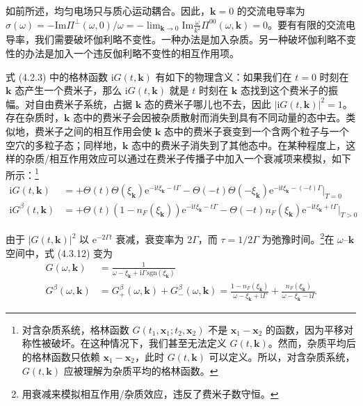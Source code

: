 如前所述，均匀电场只与质心运动耦合。因此，$\pmb{k}=0$ 的交流电导率为 $\sigma(\omega)=-\mathrm{Im}\Pi^{\perp}(\omega,0)/\omega=-\lim_{\pmb{k}\to 0}\mathrm{Im}\frac{\omega}{k^2}\Pi^{00}(\omega,\pmb{k})=0$。要有有限的交流电导率，我们需要破坏伽利略不变性。一种办法是加入杂质。另一种破坏伽利略不变性的办法是加入一个违反伽利略不变性的相互作用项。

式 (4.2.3) 中的格林函数 $\mathrm{i}G(t,\pmb{k})$ 有如下的物理含义：如果我们在 $t=0$ 时刻在 $\pmb{k}$ 态产生一个费米子，那么 $\mathrm{i}G(t,\pmb{k})$ 就是 $t$ 时刻在 $\pmb{k}$ 态找到这个费米子的振幅。对自由费米子系统，占据 $\pmb{k}$ 态的费米子哪儿也不去，因此 $|\mathrm{i}G(t,\pmb{k})|^2=1$。存在杂质时，$\pmb{k}$ 态中的费米子会因被杂质散射而消失到具有不同动量的态中去。类似地，费米子之间的相互作用会使 $\pmb{k}$ 态中的费米子衰变到一个含两个粒子与一个空穴的多粒子态；同样地，$\pmb{k}$ 态中的费米子消失到了其他态中。在某种程度上，这样的杂质/相互作用效应可以通过在费米子传播子中加入一个衰减项来模拟，如下所示：\footnote{对含杂质系统，格林函数 $G(t_1,\pmb{x}_1;t_2,\pmb{x}_2)$ 不是 $\pmb{x}_1-\pmb{x}_2$ 的函数，因为平移对称性被破坏。在这种情况下，我们甚至无法定义 $G(t,\pmb{k})$。然而，杂质平均后的格林函数只依赖 $\pmb{x}_1-\pmb{x}_2$，此时 $G(t,\pmb{k})$ 可以定义。所以，对含杂质系统，$G(t,\pmb{k})$ 应被理解为杂质平均的格林函数。}
\begin{align*}
\mathrm{i}G(t,\pmb{k}) &= +\Theta(t)\Theta(\xi_{\pmb{k}})\mathrm{e}^{-\mathrm{i}t\xi_{\pmb{k}}-t\Gamma} - \Theta(-t)\Theta(-\xi_{\pmb{k}})\mathrm{e}^{-\mathrm{i}t\xi_{\pmb{k}}-(-t)\Gamma}\Big|_{T=0}\\
\mathrm{i}G^{\beta}(t,\pmb{k}) &= +\Theta(t)\left(1-n_F(\xi_{\pmb{k}})\right)\mathrm{e}^{-\mathrm{i}t\xi_{\pmb{k}}-t\Gamma} - \Theta(-t)n_F(\xi_{\pmb{k}})\mathrm{e}^{-\mathrm{i}t\xi_{\pmb{k}}+t\Gamma}\Big|_{T>0} \tag{4.3.12}
\end{align*}

由于 $|G(t,\pmb{k})|^2$ 以 $\mathrm{e}^{-2\Gamma t}$ 衰减，衰变率为 $2\Gamma$，而 $\tau=1/2\Gamma$ 为弛豫时间。\footnote{用衰减来模拟相互作用/杂质效应，违反了费米子数守恒。}在 $\omega$–$\pmb{k}$ 空间中，式 (4.3.12) 变为
\begin{align*}
G(\omega,\pmb{k}) &= \frac{1}{\omega-\xi_{\pmb{k}}+\mathrm{i}\Gamma\,\mathrm{sgn}(\xi_{\pmb{k}})} \tag{4.3.13}\\
G^{\beta}(\omega,\pmb{k}) &= G^{\beta}_+(\omega,\pmb{k}) + G^{\beta}_-(\omega,\pmb{k}) = \frac{1-n_F(\xi_{\pmb{k}})}{\omega-\xi_{\pmb{k}}+\mathrm{i}\Gamma} + \frac{n_F(\xi_{\pmb{k}})}{\omega-\xi_{\pmb{k}}-\mathrm{i}\Gamma} \tag{4.3.14}
\end{align*}

